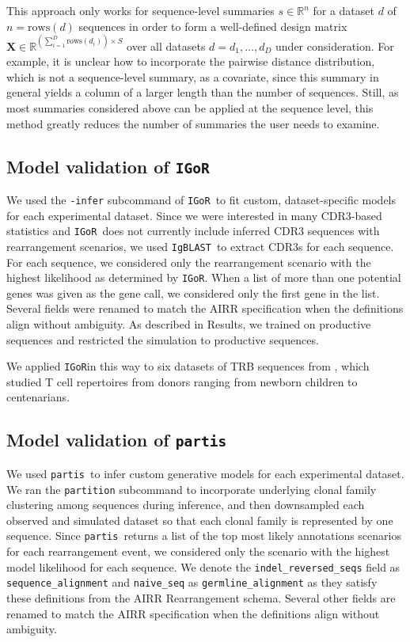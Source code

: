\documentclass{article}
\newcommand{\partis}{\texttt{partis}}
\newcommand{\igor}{\texttt{IGoR}}
\newcommand{\igblast}{\texttt{IgBLAST}}
\begin{document}
This approach only works for sequence-level summaries $s \in \mathbb{R}^n$ for a dataset $d$ of $n = \text{rows}(d)$ sequences in order to form a well-defined design matrix $\mathbf X \in \mathbb{R}^{\left(\sum_{i=1}^D \text{rows}(d_i) \right) \times S}$ over all datasets $d = d_1, \dotsc, d_D$ under consideration.
For example, it is unclear how to incorporate the pairwise distance distribution, which is not a sequence-level summary, as a covariate, since this summary in general yields a column of a larger length than the number of sequences.
Still, as most summaries considered above can be applied at the sequence level, this method greatly reduces the number of summaries the user needs to examine.

\subsection*{Model validation of \igor}
We used the \texttt{-infer} subcommand of \igor\ to fit custom, dataset-specific models for each experimental dataset.
Since we were interested in many CDR3-based statistics and \igor\ does not currently include inferred CDR3 sequences with rearrangement scenarios, we used \igblast\ to extract CDR3s for each sequence.
For each sequence, we considered only the rearrangement scenario with the highest likelihood as determined by \igor.
When a list of more than one potential genes was given as the gene call, we considered only the first gene in the list.
Several fields were renamed to match the AIRR specification when the definitions align without ambiguity.
As described in Results, we trained on productive sequences and restricted the simulation to productive sequences.

We applied \igor in this way to six datasets of TRB sequences from \cite{Britanova2016-iw}, which studied T cell repertoires from donors ranging from newborn children to centenarians.

\subsection*{Model validation of \partis}

We used \partis\ to infer custom generative models for each experimental dataset.
We ran the \texttt{partition} subcommand to incorporate underlying clonal family clustering among sequences during inference, and then downsampled each observed and simulated dataset so that each clonal family is represented by one sequence.
Since \partis\ returns a list of the top most likely annotations scenarios for each rearrangement event, we considered only the scenario with the highest model likelihood for each sequence.
We denote the \texttt{indel\_reversed\_seqs} field as \texttt{sequence\_alignment} and \texttt{naive\_seq} as \texttt{germline\_alignment} as they satisfy these definitions from the AIRR Rearrangement schema.
Several other fields are renamed to match the AIRR specification when the definitions align without ambiguity.
\end{document}
